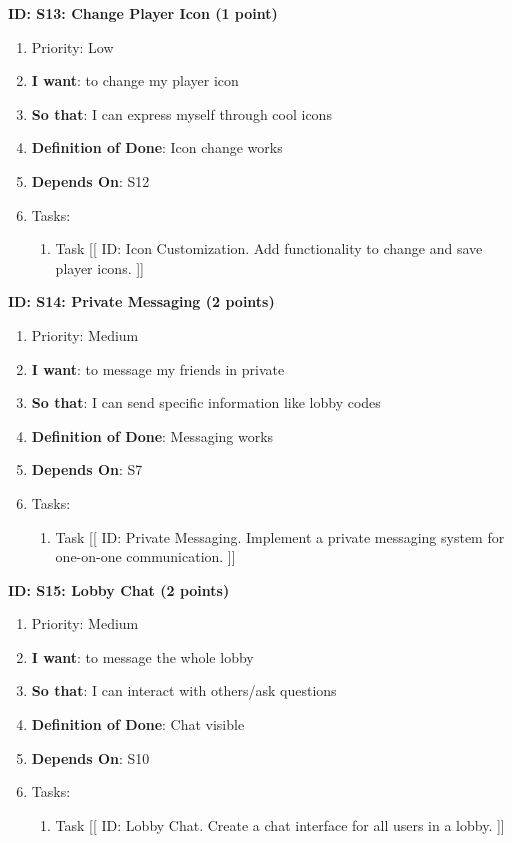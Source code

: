 \textbf{ID: S13: Change Player Icon (1 point)}
\begin{enumerate}
    \item Priority: Low
    \item \textbf{I want}: to change my player icon
    \item \textbf{So that}: I can express myself through cool icons
    \item \textbf{Definition of Done}: Icon change works
    \item \textbf{Depends On}: S12
    \item Tasks:
    \begin{enumerate}
        \item Task [[ ID: Icon Customization. Add functionality to change and save player icons. ]]
    \end{enumerate}
\end{enumerate}

\textbf{ID: S14: Private Messaging (2 points)}
\begin{enumerate}
    \item Priority: Medium
    \item \textbf{I want}: to message my friends in private
    \item \textbf{So that}: I can send specific information like lobby codes
    \item \textbf{Definition of Done}: Messaging works
    \item \textbf{Depends On}: S7
    \item Tasks:
    \begin{enumerate}
        \item Task [[ ID: Private Messaging. Implement a private messaging system for one-on-one communication. ]]
    \end{enumerate}
\end{enumerate}

\textbf{ID: S15: Lobby Chat (2 points)}
\begin{enumerate}
    \item Priority: Medium
    \item \textbf{I want}: to message the whole lobby
    \item \textbf{So that}: I can interact with others/ask questions
    \item \textbf{Definition of Done}: Chat visible
    \item \textbf{Depends On}: S10
    \item Tasks:
    \begin{enumerate}
        \item Task [[ ID: Lobby Chat. Create a chat interface for all users in a lobby. ]]
    \end{enumerate}
\end{enumerate}

